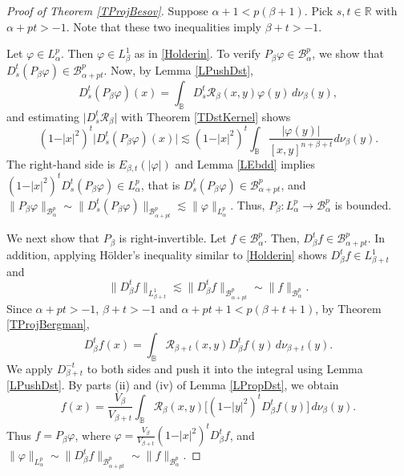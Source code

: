 \documentclass{amsart}
\theoremstyle{definition}
\theoremstyle{remark}
\begin{document}
\begin{proof}[Proof of Theorem \ref{TProjBesov}]
Suppose $\alpha+1<p(\beta+1)$.
Pick $s,t\in\mathbb R$ with $\alpha+pt>-1$.
Note that these two inequalities imply $\beta+t>-1$.

Let $\varphi\in L^p_\alpha$.
Then $\varphi\in L^1_\beta$ as in \eqref{Holderin}.
To verify $P_\beta\varphi\in\mathcal B^p_\alpha$, we show that
$D^t_s(P_\beta\varphi)\in\mathcal B^p_{\alpha+pt}$.
Now, by Lemma \ref{LPushDst},
\begin{equation*}
D^t_s(P_\beta\varphi)(x)
=\int_{\mathbb B}D^t_s\mathcal R_\beta(x,y)\varphi(y)\,d\nu_\beta(y),
\end{equation*}
and estimating $\vert D^t_s\mathcal R_\beta\vert$ with Theorem \ref{TDstKernel}
shows
\begin{equation*}
(1-\vert x\vert^2)^t\vert D^t_s(P_\beta\varphi)(x)\vert
\lesssim (1-\vert x\vert^2)^t
\int_{\mathbb B}\frac{\vert\varphi(y)\vert}{[x,y]^{n+\beta+t}}d\nu_\beta(y).
\end{equation*}
The right-hand side is $E_{\beta,t}(\vert\varphi\vert)$ and Lemma \ref{LEbdd}
implies $(1-\vert x\vert^2)^t D^t_s(P_\beta \varphi)\in L^p_\alpha$, that is
$D^t_s(P_\beta \varphi)\in\mathcal B^p_{\alpha+pt}$, and
$\|P_\beta \varphi\|_{\mathcal B^p_\alpha}
\sim \|D^t_s(P_\beta \varphi)\|_{\mathcal B^p_{\alpha+pt}}
\lesssim \|\varphi\|_{L^p_\alpha}$.
Thus, $P_\beta \colon L^p_\alpha\to\mathcal B^p_\alpha$ is bounded.

We next show that $P_\beta$ is right-invertible.
Let $f\in\mathcal B^p_\alpha$.
Then, $D^t_\beta f\in\mathcal B^p_{\alpha+pt}$.
In addition, applying H\"older's inequality similar to \eqref{Holderin}
shows $D^t_\beta f\in L^1_{\beta+t}$ and
\begin{equation}\label{DtinL1}
\|D^t_\beta f\|_{L^1_{\beta+t}}\lesssim \|D^t_\beta f\|_{\mathcal B^p_{\alpha+pt}}
\sim\|f\|_{\mathcal B^p_\alpha}.
\end{equation}
Since $\alpha+pt>-1$, $\beta+t>-1$ and $\alpha+pt+1<p(\beta+t+1)$,
by Theorem \ref{TProjBergman},
\begin{equation*}
D^t_\beta f(x)
=\int_{\mathbb B}\mathcal R_{\beta+t}(x,y) D^t_\beta f(y)\,d\nu_{\beta+t}(y).
\end{equation*}
We apply $D^{-t}_{\beta+t}$ to both sides and push it into the integral
using Lemma \ref{LPushDst}.
By parts (ii) and (iv) of Lemma \ref{LPropDst}, we obtain
\begin{equation*}
f(x)=\frac{V_\beta}{V_{\beta+t}}\int_{\mathbb B}\mathcal R_\beta(x,y)
\bigl[(1-\vert y\vert^2)^t D^t_\beta f(y)\bigr]\,d\nu_\beta(y).
\end{equation*}
Thus $f=P_\beta\varphi$, where
$\varphi=\frac{V_\beta}{V_{\beta+t}}(1-\vert x\vert^2)^t D^t_\beta f$,
and
$\|\varphi\|_{L^p_\alpha}\sim\|D^t_\beta f\|_{\mathcal B^p_{\alpha+pt}}
\sim \|f\|_{\mathcal B^p_\alpha}$.


\end{proof}
\end{document}
